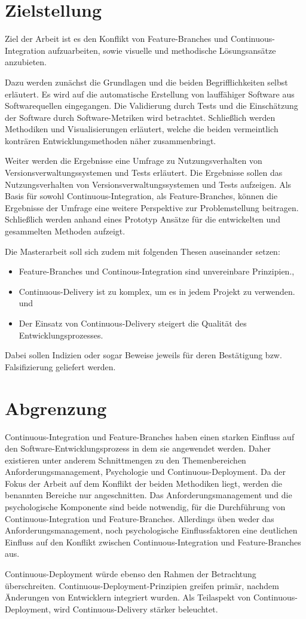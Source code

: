 \section{Zielstellung}

Ziel der Arbeit ist es den Konflikt von \glqq Feature-Branches\grqq{} und \glqq Continuous-Integration\grqq{} aufzuarbeiten, sowie visuelle und methodische Lösungsansätze anzubieten. 

Dazu werden zunächst die Grundlagen und die beiden Begrifflichkeiten selbst erläutert. Es wird auf die automatische Erstellung von lauffähiger Software aus Softwarequellen eingegangen. Die Validierung durch Tests und die Einschätzung der Software durch Software-Metriken wird betrachtet. Schließlich werden Methodiken und Visualisierungen erläutert, welche die beiden vermeintlich konträren Entwicklungsmethoden näher zusammenbringt.

Weiter werden die Ergebnisse eine Umfrage zu \glqq Nutzungsverhalten von Versionsverwaltungssystemen und Tests\grqq{} erläutert. Die Ergebnisse sollen das Nutzungsverhalten von Versionsverwaltungssystemen und Tests aufzeigen. Als Basis für sowohl Continuous-Integration, als Feature-Branches, können die Ergebnisse der Umfrage eine weitere Perspektive zur Problemstellung beitragen. Schließlich werden anhand eines Prototyp Ansätze für die entwickelten und gesammelten Methoden aufzeigt.

Die Masterarbeit soll sich zudem mit folgenden Thesen auseinander setzen:
\begin{itemize}
\item \glqq Feature-Branches und Continous-Integration sind unvereinbare Prinzipien.\grqq{},
\item \glqq Continuous-Delivery ist zu komplex, um es in jedem Projekt zu verwenden.\grqq{} und
\item \glqq Der Einsatz von Continuous-Delivery steigert die Qualität des Entwicklungsprozesses.\grqq{}
\end{itemize}
Dabei sollen Indizien oder sogar Beweise jeweils für deren Bestätigung bzw. Falsifizierung geliefert werden.

\section{Abgrenzung}

Continuous-Integration und Feature-Branches haben einen starken Einfluss auf den Software-Entwicklungsprozess in dem sie angewendet werden. Daher existieren unter anderem Schnittmengen zu den Themenbereichen Anforderungsmanagement, Psychologie und Continuous-Deployment. 
Da der Fokus der Arbeit auf dem Konflikt der beiden Methodiken liegt, werden die benannten Bereiche nur angeschnitten. Das Anforderungsmanagement und die psychologische Komponente sind beide notwendig, für die Durchführung von Continuous-Integration und Feature-Branches. Allerdings üben weder das Anforderungsmanagement, noch psychologische Einflussfaktoren eine deutlichen Einfluss auf den Konflikt zwischen Continuous-Integration und Feature-Branches aus. 

Continuous-Deployment würde ebenso den Rahmen der Betrachtung überschreiten. Continuous-Deployment-Prinzipien greifen primär, nachdem Änderungen von Entwicklern integriert wurden. Als Teilaspekt von Continuous-Deployment, wird Continuous-Delivery stärker beleuchtet.